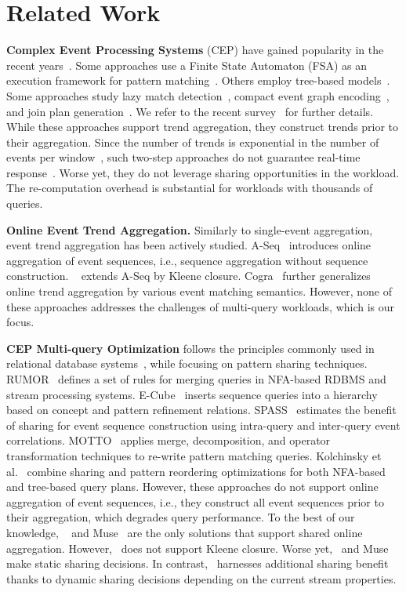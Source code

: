 \section{Related Work}
\label{sec:related}


\textbf{Complex Event Processing Systems} (CEP) have gained popularity in the recent years~\cite{esper,flink,streaminsight,oracle}. Some approaches use a Finite State Automaton (FSA) as an execution framework for pattern matching~\cite{ADGI08,DGPRSW07,WDR06,ZDI14}. Others employ tree-based models~\cite{MM09}. Some approaches study lazy match detection~\cite{KSS15}, compact event graph encoding~\cite{PLAR17}, and join plan generation~\cite{KS18join}. We refer to the recent survey~\cite{Giatrakos2020} for further details.
%
While these approaches support trend aggregation, they construct trends prior to their aggregation. Since the number of trends is exponential in the number of events per window~\cite{QCRR14, ZDI14}, such two-step approaches do not guarantee real-time response~\cite{PLRM18,PLRM19}. Worse yet, they do not leverage sharing opportunities in the workload. The re-computation overhead is substantial for workloads with thousands of queries.


\textbf{Online Event Trend Aggregation.} Similarly to single-event aggregation, event trend aggregation has been actively studied. A-Seq~\cite{QCRR14} introduces online aggregation of event sequences, i.e., sequence aggregation without sequence construction. \greta~\cite{PLRM18} extends A-Seq by Kleene closure. Cogra~\cite{PLRM19} further generalizes online trend aggregation by various event matching semantics. However, none of these approaches addresses the challenges of multi-query workloads, which is our focus.


\textbf{CEP Multi-query Optimization} follows the principles commonly used in relational database systems~\cite{Sellis:1988}, while focusing on pattern sharing techniques. RUMOR~\cite{hong2009rule} defines a set of rules for merging queries in NFA-based RDBMS and stream processing systems. E-Cube~\cite{LRGGWAM11} inserts sequence queries into a hierarchy based on concept and pattern refinement relations. SPASS~\cite{RLR16} estimates the benefit of sharing for event sequence construction using intra-query and inter-query event correlations. MOTTO~\cite{ZVDH17} applies merge, decomposition, and operator transformation techniques to re-write pattern matching queries. Kolchinsky et al.~\cite{KS19} combine sharing and pattern reordering optimizations for both NFA-based and tree-based query plans.
%
However, these approaches do not support online aggregation of event sequences, i.e., they construct all event sequences prior to their aggregation, which degrades query performance. To the best of our knowledge, \sharon~\cite{PRLRM18} and Muse~\cite{RPLR20} are the only solutions that support shared online aggregation. However, \sharon\ does not support Kleene closure. Worse yet, \sharon\ and Muse make static sharing decisions. In contrast, \app\ harnesses additional sharing benefit thanks to dynamic sharing decisions depending on the current stream properties. 


